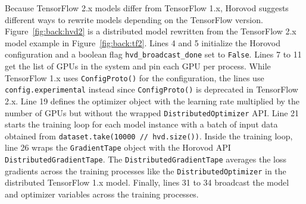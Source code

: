Because TensorFlow 2.x models differ from TensorFlow 1.x, Horovod
suggests different ways to rewrite models depending on the TensorFlow version.
Figure~\ref{fig:back:hvd2} is a distributed model rewritten from the
TensorFlow 2.x model example in Figure~\ref{fig:back:tf2}.
Lines 4 and 5 initialize the Horovod configuration and a boolean flag
{\tt hvd\_broadcast\_done} set to {\tt False}.
Lines 7 to 11 get the list of GPUs in the system and pin each GPU per
process. 
While TensorFlow 1.x uses {\tt ConfigProto()} for the configuration, the lines
use {\tt config.experimental} instead since {\tt ConfigProto()} is deprecated
in TensorFlow 2.x.
Line 19 defines the optimizer object with the learning rate multiplied by
the number of GPUs but without the wrapped {\tt DistributedOptimizer} API.
Line 21 starts the training loop for each model instance with a batch of
input data obtained from {\tt dataset.take(10000 // hvd.size())}.
Inside the training loop,
line 26 wraps the {\tt GradientTape} object with the Horovod API  {\tt
DistributedGradientTape}.
The {\tt DistributedGradientTape} averages the loss gradients across the
training processes like the {\tt DistributedOptimizer} in the
distributed TensorFlow 1.x model.
Finally, lines 31 to 34 broadcast the model and optimizer variables
across the training processes.
